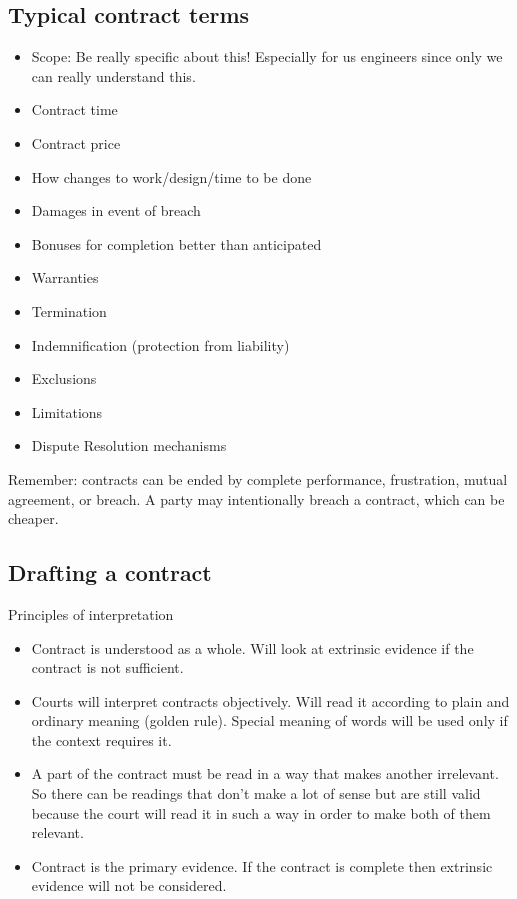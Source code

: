 \documentclass[10pt]{article}
\begin{document}
\subsection{Typical contract terms}
\begin{itemize}
	\item Scope: Be really specific about this! Especially for us engineers since only we can really understand this.
	\item Contract time
	\item  Contract price
	\item  How changes to work/design/time to be done
	\item  Damages in event of breach
	\item  Bonuses for completion better than anticipated
	\item Warranties
	\item  Termination
	\item Indemnification (protection from liability)
	\item Exclusions
	\item Limitations
	\item Dispute Resolution mechanisms
\end{itemize}

Remember: contracts can be ended by complete performance, frustration, mutual agreement, or breach. A party may intentionally breach a contract, which can be cheaper.



\subsection{Drafting a contract}

Principles of interpretation
\begin{itemize}
	\item Contract is understood as a whole. Will look at extrinsic evidence if the contract is not sufficient. 
	\item Courts will interpret contracts objectively. Will read it according to plain and ordinary meaning (golden rule). Special meaning of words will be used only if the context requires it. 
	\item A part of the contract must be read in a way that makes another irrelevant. So there can be readings that don't make a lot of sense but are still valid because the  court will read it in such a way in order to make both of them relevant.
	\item Contract is the primary evidence. If the contract is complete then extrinsic evidence will not be considered.
\end{itemize}
\end{document}
